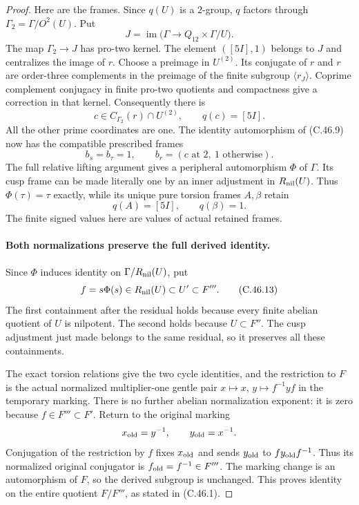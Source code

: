 \begin{proof}
Here are the frames. Since $q(U)$ is a $2$-group, $q$ factors
through $\Gamma_2=\Gamma/O^2(U)$. Put
\[
 J=\operatorname{im}\bigl(\Gamma\to Q_{12}\times\Gamma/U\bigr).
\]
The map $\Gamma_2\to J$ has pro-two kernel. The element
$([5I],1)$ belongs to $J$ and centralizes the image of $r$.
Choose a preimage in $U^{(2)}$. Its conjugate of $r$ and $r$
are order-three complements in the preimage of the finite subgroup
$\langle r_J\rangle$. Coprime complement conjugacy in finite
pro-two quotients and compactness give a correction in that kernel.
Consequently there is
\[
 c\in C_{\Gamma_2}(r)\cap U^{(2)},\qquad q(c)=[5I].  \tag{C.46.10}
\]
All the other prime coordinates are one. The identity automorphism
of (C.46.9) now has the compatible prescribed frames
\[
 b_s=b_\tau=1,\qquad b_r=(c\text{ at }2,\ 1\text{ otherwise}).
                                                               \tag{C.46.11}
\]
The full relative lifting argument gives a peripheral automorphism
$\Phi$ of $\Gamma$. Its cusp frame can be made literally one by
an inner adjustment in $R_{\rm nil}(U)$. Thus $\Phi(\tau)=\tau$
exactly, while its unique pure torsion frames $A,\beta$ retain
\[
                    q(A)=[5I],\qquad q(\beta)=1.      \tag{C.46.12}
\]
The finite signed values here are values of actual retained frames.

\paragraph{Both normalizations preserve the full derived identity.}
Since $\Phi$ induces identity on $\Gamma/R_{\rm nil}(U)$, put
\[
 f=s\Phi(s)\in R_{\rm nil}(U)\subset U'\subset F''' . \tag{C.46.13}
\]
The first containment after the residual holds because every finite
abelian quotient of $U$ is nilpotent. The second holds because
$U\subset F''$. The cusp adjustment just made belongs to the same
residual, so it preserves all these containments.

The exact torsion relations give the two cycle identities, and the
restriction to $F$ is the actual normalized multiplier-one gentle
pair $x\mapsto x$, $y\mapsto f^{-1}yf$ in the temporary marking.
There is no further abelian normalization exponent: it is zero
because $f\in F'''\subset F'$. Return to the original marking
\[
             x_{\rm old}=y^{-1},\qquad y_{\rm old}=x^{-1}.
\]
Conjugation of the restriction by $f$ fixes $x_{\rm old}$ and
sends $y_{\rm old}$ to $f y_{\rm old}f^{-1}$. Thus its normalized
original conjugator is $f_{\rm old}=f^{-1}\in F'''$.
The marking change is an automorphism of $F$, so the derived
subgroup is unchanged. This proves identity on the entire quotient
$F/F'''$, as stated in (C.46.1).


\end{proof}
